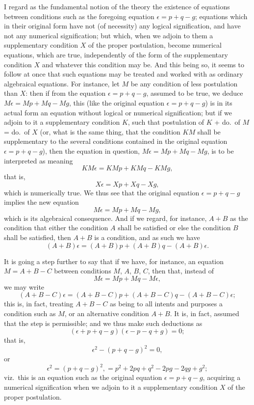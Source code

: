 \documentclass[11pt,a4paper]{book}
\begin{document}
I regard as the fundamental notion of the theory the existence of equations between conditions such as the foregoing equation $\epsilon = p + q - g$; equations which in their original form have not (of necessity) any logical signification, and have not any numerical signification; but which, when we adjoin to them a supplementary condition $X$ of the proper postulation, become numerical equations, which are true, independently of the form of the supplementary condition $X$ and whatever this condition may be. And this being so, it seems to follow at once that such equations may be treated and worked with as ordinary algebraical equations. For instance, let $M$ be any condition of less postulation than $X$: then if from the equation $\epsilon = p + q - g$, assumed to be true, we deduce $M\epsilon = Mp + Mq - Mg$, this (like the original equation $\epsilon = p + q - g$) is in its actual form an equation without logical or numerical signification; but if we adjoin to it a supplementary condition $K$, such that postulation of $K$ + do.\ of $M$ = do.\ of $X$ (or, what is the same thing, that the condition $KM$ shall be supplementary to the several conditions contained in the original equation $\epsilon = p + q - g$), then the equation in question, $M\epsilon = Mp + Mq - Mg$, is to be interpreted as meaning
\[
KM\epsilon = KMp + KMq - KMg,
\]
that is,
\[
X\epsilon = Xp + Xq - Xg,
\]
which is numerically true. We thus see that the original equation $\epsilon = p + q - g$ implies the new equation
\[
M\epsilon = Mp + Mq - Mg,
\]
which is its algebraical consequence. And if we regard, for instance, $A + B$ as the condition that either the condition $A$ shall be satisfied or else the condition $B$ shall be satisfied, then $A + B$ is a condition, and as such we have
\[
(A + B)\epsilon = (A + B)p + (A + B)q - (A + B)\epsilon.
\]

It is going a step further to say that if we have, for instance, an equation $M = A + B - C$ between conditions $M$, $A$, $B$, $C$, then that, instead of
\[
M\epsilon = Mp + Mq - M\epsilon,
\]
we may write
\[
(A + B - C)\epsilon = (A + B - C)p + (A + B - C)q - (A + B - C)\epsilon;
\]
this is, in fact, treating $A + B - C$ as being to all intents and purposes a condition such as $M$, or an alternative condition $A + B$. It is, in fact, assumed that the step is permissible; and we thus make such deductions as
\[
(\epsilon + p + q - g)(\epsilon - p - q + g) = 0;
\]
that is,
\[
\epsilon^2 - (p + q - g)^2 = 0,
\]
or
\[
\epsilon^2 = (p + q - g)^2, = p^2 + 2pq + q^2 - 2pg - 2qg + g^2;
\]
viz.\ this is an equation such as the original equation $\epsilon = p + q - g$, acquiring a numerical signification when we adjoin to it a supplementary condition $X$ of the proper postulation.
\end{document}
